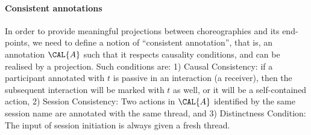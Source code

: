 

\paragraph{Consistent annotations} In order to provide meaningful
projections between choreographies and its end-points, we need to
define a notion of ``consistent annotation'', that is, an annotation
$\CAL{A}$ such that it respects causality conditions, and can be
realised by a projection.
Such conditions are: 1) Causal Consistency: if a participant annotated
with $t$ is passive in an interaction (a receiver), then the
subsequent interaction will be marked with $t$ as well, or it will be
a self-contained action, 2) Session Consistency: Two actions in
$\CAL{A}$ identified by the same session name are annotated with the
same thread, and 3) Distinctness Condition: The input of session
initiation is always given a fresh thread.

